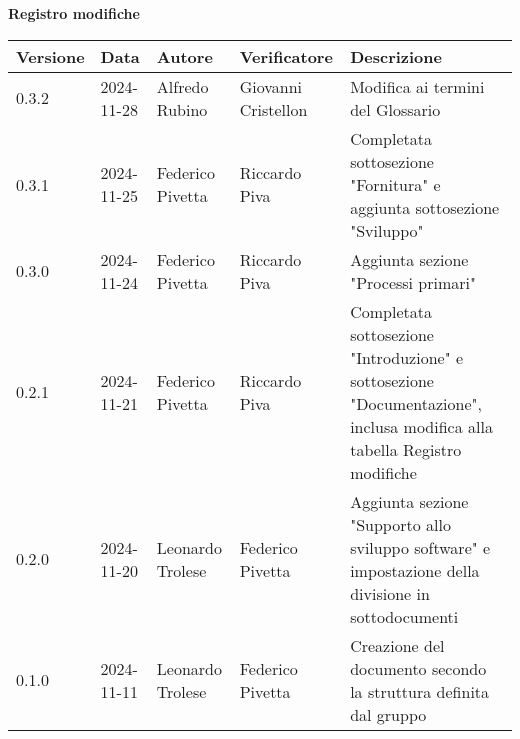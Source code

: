 
\begin{center}
\textbf{Registro modifiche}\\
\vspace{2mm}

\begin{tabularx}{\textwidth}{|l|l|l|l|X|}
\hline
\textbf{Versione} & \textbf{Data} & \textbf{Autore} & \textbf{Verificatore} & \textbf{Descrizione}\\
    \hline
    0.3.2 & 2024-11-28  & Alfredo Rubino & Giovanni Cristellon & Modifica ai termini del Glossario\\
    \hline
    0.3.1 & 2024-11-25  & Federico Pivetta & Riccardo Piva & Completata sottosezione "Fornitura" e aggiunta sottosezione "Sviluppo"\\
    \hline
    0.3.0 & 2024-11-24  & Federico Pivetta & Riccardo Piva & Aggiunta sezione "Processi primari"\\
    \hline
     0.2.1 & 2024-11-21  & Federico Pivetta  & Riccardo Piva& Completata sottosezione "Introduzione" e sottosezione "Documentazione", inclusa modifica alla tabella Registro modifiche\\
    \hline
    0.2.0 & 2024-11-20  & Leonardo Trolese & Federico Pivetta  & Aggiunta sezione "Supporto allo sviluppo software" e impostazione della divisione in sottodocumenti\\
    \hline
    0.1.0 & 2024-11-11  & Leonardo Trolese & Federico Pivetta  & Creazione del documento secondo la struttura definita dal gruppo\\
    \hline

\end{tabularx}
\end{center}